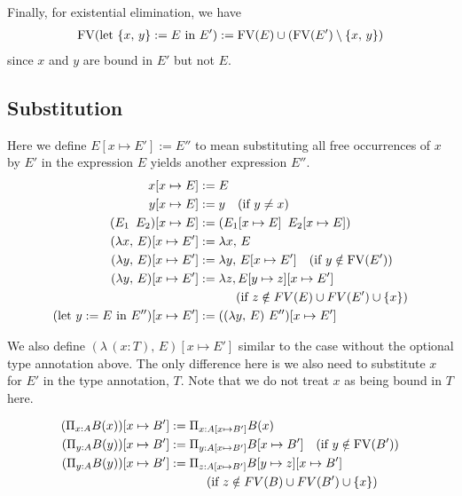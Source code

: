 \documentclass{article}
\begin{document}
Finally, for existential elimination, we have
\begin{align*}
  \operatorname{FV}(\text{let } \{x, \, y\} := E \text{ in } E') := 
    \operatorname{FV}(E) \cup (\operatorname{FV}(E') \setminus \{x, \, y\}) 
\end{align*}
since $x$ and $y$ are bound in $E'$ but not $E$.

\subsection{Substitution}
Here we define $E [x \mapsto E'] := E''$ to mean substituting all free
occurrences of $x$ by $E'$ in the expression $E$ yields another expression $E''$.
\begin{align*}
  x[x \mapsto E] &:= E \\
  y[x \mapsto E] &:= y \quad (\text{if } y \ne x) \\
  (E_1 \,\,\, E_2) [x \mapsto E] &:= (E_1 [x \mapsto E] \,\,\, E_2 [x \mapsto E]) \\
  (\lambda x, \, E) [x \mapsto E'] &:= \lambda x, \, E \\ 
  (\lambda y, \, E) [x \mapsto E'] &:= \lambda y, \, E[x \mapsto E'] \quad (\text{if } y \notin \operatorname{FV}(E')) \\ 
  (\lambda y, \, E) [x \mapsto E'] &:= \lambda z, E[y \mapsto z][x \mapsto E'] \\
                 &\quad \quad \quad (\text{if } z \notin FV(E) \cup FV(E') \cup \{x\}) \\
  (\text{let } y := E \text{ in } E'') [x \mapsto E'] &:= 
    ((\lambda y, \, E) \,\, E'') [x \mapsto E']
\end{align*}

We also define $(\lambda \, (x : T), \, E) [x \mapsto E']$
similar to the case without the optional type annotation above. The only
difference here is we also need to substitute $x$ for $E'$ in the type annotation,
$T$. Note that we do not treat $x$ as being bound in $T$ here.

\begin{align*}
  (\Pi_{x : A} B(x)) [x \mapsto B'] &:= \Pi_{x : A[x \mapsto B']} B(x) \\ 
  (\Pi_{y : A} B(y)) [x \mapsto B'] &:= \Pi_{y : A[x \mapsto B']} B[x \mapsto B'] \quad (\text{if } y \notin \operatorname{FV}(B')) \\ 
  (\Pi_{y : A} B(y)) [x \mapsto B'] &:= \Pi_{z : A[x \mapsto B']} B[y \mapsto z][x \mapsto B'] \\
                 &\quad \quad \quad (\text{if } z \notin FV(B) \cup FV(B') \cup \{x\})
\end{align*}
\end{document}

